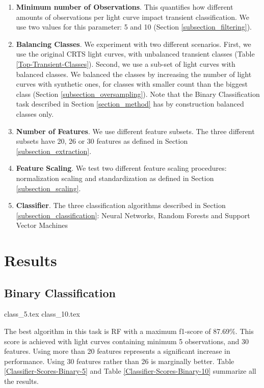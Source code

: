 \documentclass[a4paper,fleqn,usenatbib]{mnras}
\begin{document}
\begin{enumerate}
    \item \textbf{Minimum number of Observations}. 
      This quantifies how  different amounts of observations
      per light curve impact transient classification.
      We use two values for this parameter: 5 and 10 (Section \ref{subsection_filtering}). 
    \item \textbf{Balancing Classes}. 
      We experiment with two different scenarios.
      First, we use the original CRTS light curves, with unbalanced transient classes (Table
      \ref{Top-Transient-Classes}).
      Second, we use a sub-set of light curves with balanced classes. 
      We balanced the classes by increasing the number of light 
      curves with synthetic ones, for classes with smaller count than the biggest class (Section
      \ref{subsection_oversampling}).
      Note that the Binary Classification task described in Section
      \ref{section_method} has by construction balanced classes only.
    
    \item \textbf{Number of Features}. 
      We use different feature subsets. 
      The three different subsets have 20, 26 or 30 features as
      defined in Section \ref{subsection_extraction}. 
    \item \textbf{Feature Scaling}. 
      We test two different feature scaling procedures: normalization
      scaling and standardization as defined in Section
      \ref{subsection_scaling}. 
    \item \textbf{Classifier}. 
      The three classification algorithms described in Section 
      \ref{subsection_classification}: Neural Networks, 
      Random Forests and Support Vector Machines 
\end{enumerate}


\section{Results} 
\label{section_results}

\subsection{Binary Classification} 
\label{Results-Binary} 

{class_5.tex}
{class_10.tex}


The best algorithm in this task is RF with a maximum f1-score of
87.69\%.   
This score is achieved with light curves containing minimum 5
observations, and 30 features.
Using more than 20 features represents a significant increase in
performance.
Using 30 features rather than 26 is marginally better. 
Table \ref{Classifier-Scores-Binary-5} and Table 
\ref{Classifier-Scores-Binary-10} summarize all the results.
\end{document}
